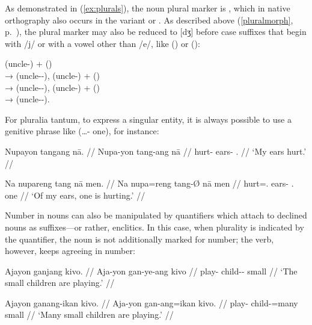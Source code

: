 As demonstrated in (\ref{ex:plurals}), the noun plural marker is 
, which in native orthography also occurs in the variant 
 or . As described above (\autoref{pluralmorph}, 
p.~\pageref{pluralmorph}), the plural marker may also be reduced to [dʒ] 
 before case suffixes that begin with /j/ or with a vowel other than 
/e/, like  (\Aarg{}) or  (\Dat{}):

\pex
	\a {} (uncle-\Aarg{})
		+  (\Pl{}) \\[0.5\baselineskip]
		→  (uncle-\Pl{}-\Aarg{}),
	\a {} (uncle-\Gen{})
		+  (\Pl{}) \\[0.5\baselineskip]
		→  (uncle-\Pl{}-\Gen{}),
	\a {} (uncle-\Dat{})
		+  (\Pl{}) \\[0.5\baselineskip]
		→  (uncle-\Pl{}-\Dat{}).
\xe

For pluralia tantum, to express a singular entity, it is always possible to 
use a genitive phrase like  (…-\Gen{} 
one), for instance:

\pex
\a\begingl
	\gla Nupayon tangang nā. //
	\glb Nupa-yon tang-ang nā //
	\glc hurt-\TplN{} ears-\Aarg{} \Fsg{}.\Gen{} //
	\glft `My ears hurt.' //
\endgl

\a\label{ex:gensubj}\begingl
	\gla Na nupareng tang nā men. //
	\glb Na nupa=reng tang-Ø nā men //
	\glc \GenT{} hurt=\TsgI{}.\Aarg{} ears-\Top{} \Fsg{}.\Gen{} one //
	\glft `Of my ears, one is hurting.' //
\endgl
\xe

Number in nouns can also be manipulated by quantifiers which attach to declined
nouns as suffixes---or rather, enclitics. In this case, when plurality is
indicated by the quantifier, the noun is not additionally marked for number;
the verb, however, keeps agreeing in number:

\pex
\a\begingl
	\gla Ajayon ganjang kivo. //
	\glb Aja-yon gan-ye-ang kivo //
	\glc play-\TsgN{} child-\Pl{}-\Aarg{} small //
	\glft `The small children are playing.' //
\endgl
	
\a\label{ex:nounquant}\begingl
	\gla Ajayon ganang-ikan kivo. //
	\glb Aja-yon gan-ang=ikan kivo. //
	\glc play-\TsgN{} child-\Aarg{}=many small //
	\glft `Many small children are playing.' //
\endgl

